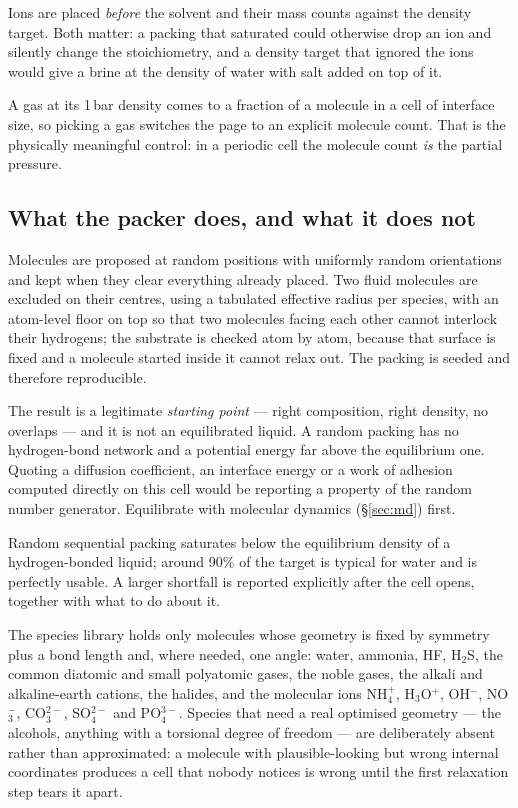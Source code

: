 Ions are placed \emph{before} the solvent and their mass counts against the
density target. Both matter: a packing that saturated could otherwise drop an
ion and silently change the stoichiometry, and a density target that ignored
the ions would give a brine at the density of water with salt added on top of
it.

\begin{caltip}
A gas at its 1\,bar density comes to a fraction of a molecule in a cell of
interface size, so picking a gas switches the page to an explicit molecule
count. That is the physically meaningful control: in a periodic cell the
molecule count \emph{is} the partial pressure.
\end{caltip}

\subsection{What the packer does, and what it does not}

Molecules are proposed at random positions with uniformly random
orientations and kept when they clear everything already placed. Two fluid
molecules are excluded on their centres, using a tabulated effective radius
per species, with an atom-level floor on top so that two molecules facing
each other cannot interlock their hydrogens; the substrate is checked atom by
atom, because that surface is fixed and a molecule started inside it cannot
relax out. The packing is seeded and therefore reproducible.

\begin{calwarn}
The result is a legitimate \emph{starting point} --- right composition, right
density, no overlaps --- and it is not an equilibrated liquid. A random
packing has no hydrogen-bond network and a potential energy far above the
equilibrium one. Quoting a diffusion coefficient, an interface energy or a
work of adhesion computed directly on this cell would be reporting a property
of the random number generator. Equilibrate with molecular dynamics
(\S\ref{sec:md}) first.
\end{calwarn}

Random sequential packing saturates below the equilibrium density of a
hydrogen-bonded liquid; around 90\% of the target is typical for water and is
perfectly usable. A larger shortfall is reported explicitly after the cell
opens, together with what to do about it.

\begin{calnote}
The species library holds only molecules whose geometry is fixed by symmetry
plus a bond length and, where needed, one angle: water, ammonia, HF, H$_2$S,
the common diatomic and small polyatomic gases, the noble gases, the alkali
and alkaline-earth cations, the halides, and the molecular ions
NH$_4^{+}$, H$_3$O$^{+}$, OH$^{-}$, NO$_3^{-}$, CO$_3^{2-}$, SO$_4^{2-}$ and
PO$_4^{3-}$. Species that need a real optimised geometry --- the alcohols,
anything with a torsional degree of freedom --- are deliberately absent
rather than approximated: a molecule with plausible-looking but wrong
internal coordinates produces a cell that nobody notices is wrong until the
first relaxation step tears it apart.
\end{calnote}

